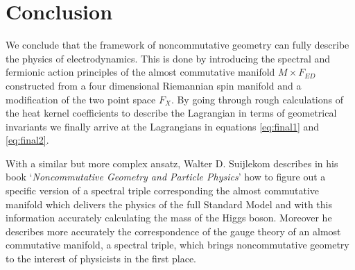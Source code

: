 \section{Conclusion}
We conclude that the framework of noncommutative geometry can fully describe
the physics of electrodynamics. This is done by introducing the spectral and
fermionic action principles of the almost commutative manifold $M \times F_{ED}$
constructed from a four dimensional Riemannian spin manifold and a
modification of the two point space $F_X$. By going through rough
calculations of the heat kernel coefficients to describe the Lagrangian in
terms of geometrical invariants we finally arrive at the Lagrangians in
equations \eqref{eq:final1} and \eqref{eq:final2}.

With a similar but more complex ansatz, Walter D. Suijlekom describes in his
book `\textit{Noncommutative Geometry and Particle Physics}' \cite{ncgwalter}
how to figure out a specific version of a spectral triple corresponding the
almost commutative manifold which delivers the physics of the full Standard
Model and with this information accurately calculating the mass of the Higgs
boson. Moreover he describes more accurately the correspondence of the gauge
theory of an almost commutative manifold, a spectral triple, which brings
noncommutative geometry to the interest of physicists in the first place.
